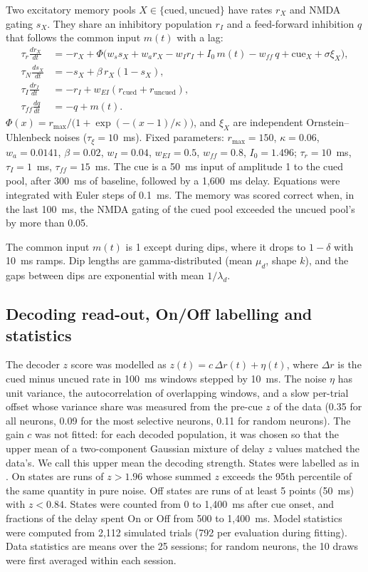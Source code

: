\documentclass[11pt]{article}
\newcommand{\cued}{\mathrm{cued}}
\newcommand{\uncued}{\mathrm{uncued}}
\begin{document}
Two excitatory memory pools $X \in \{\cued, \uncued\}$ have rates $r_X$ and NMDA gating $s_X$.
They share an inhibitory population $r_I$ and a feed-forward inhibition $q$ that follows the common input $m(t)$ with a lag:
\begin{align}
  \tau_r \frac{dr_X}{dt} &= -r_X + \Phi\bigl(w_s s_X + w_a r_X - w_I r_I + I_0\, m(t) - w_{\mathit{ff}}\, q + \mathrm{cue}_X + \sigma \xi_X\bigr), \\
  \tau_N \frac{ds_X}{dt} &= -s_X + \beta\, r_X (1 - s_X), \\
  \tau_I \frac{dr_I}{dt} &= -r_I + w_{EI} \left(r_\cued + r_\uncued\right), \\
  \tau_{\mathit{ff}} \frac{dq}{dt} &= -q + m(t).
\end{align}
$\Phi(x) = r_{\max} / \bigl(1 + \exp(-(x - 1)/\kappa)\bigr)$, and $\xi_X$ are independent Ornstein--Uhlenbeck noises ($\tau_\xi = 10$~ms).
Fixed parameters: $r_{\max} = 150$, $\kappa = 0.06$, $w_a = 0.0141$, $\beta = 0.02$, $w_I = 0.04$, $w_{EI} = 0.5$, $w_{\mathit{ff}} = 0.8$, $I_0 = 1.496$; $\tau_r = 10$~ms, $\tau_I = 1$~ms, $\tau_{\mathit{ff}} = 15$~ms.
The cue is a 50~ms input of amplitude 1 to the cued pool, after 300~ms of baseline, followed by a 1,600~ms delay.
Equations were integrated with Euler steps of 0.1~ms.
The memory was scored correct when, in the last 100~ms, the NMDA gating of the cued pool exceeded the uncued pool's by more than 0.05.

The common input $m(t)$ is 1 except during dips, where it drops to $1 - \delta$ with 10~ms ramps.
Dip lengths are gamma-distributed (mean $\mu_d$, shape $k$), and the gaps between dips are exponential with mean $1/\lambda_d$.

\subsection{Decoding read-out, On/Off labelling and statistics}

The decoder $z$ score was modelled as $z(t) = c\, \Delta r(t) + \eta(t)$, where $\Delta r$ is the cued minus uncued rate in 100~ms windows stepped by 10~ms.
The noise $\eta$ has unit variance, the autocorrelation of overlapping windows, and a slow per-trial offset whose variance share was measured from the pre-cue $z$ of the data (0.35 for all neurons, 0.09 for the most selective neurons, 0.11 for random neurons).
The gain $c$ was not fitted: for each decoded population, it was chosen so that the upper mean of a two-component Gaussian mixture of delay $z$ values matched the data's.
We call this upper mean the decoding strength.
States were labelled as in \citet{panichello2024}.
On states are runs of $z > 1.96$ whose summed $z$ exceeds the 95th percentile of the same quantity in pure noise.
Off states are runs of at least 5 points (50~ms) with $z < 0.84$.
States were counted from 0 to 1,400~ms after cue onset, and fractions of the delay spent On or Off from 500 to 1,400~ms.
Model statistics were computed from 2,112 simulated trials (792 per evaluation during fitting).
Data statistics are means over the 25 sessions; for random neurons, the 10 draws were first averaged within each session.
\end{document}
